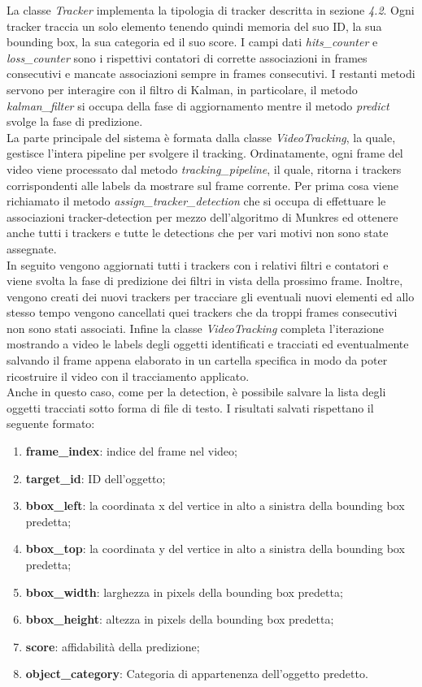 La classe \textit{Tracker} implementa la tipologia di tracker descritta in sezione \textit{4.2}. Ogni tracker traccia un solo elemento tenendo quindi memoria del suo ID, la sua bounding box, la sua categoria ed il suo score. I campi dati \textit{hits\_counter} e \textit{loss\_counter} sono i rispettivi contatori di corrette associazioni in frames consecutivi e mancate associazioni sempre in frames consecutivi. I restanti metodi servono per interagire con il filtro di Kalman, in particolare, il metodo \textit{kalman\_filter} si occupa della fase di aggiornamento mentre il metodo \textit{predict} svolge la fase di predizione.\\
La parte principale del sistema è formata dalla classe \textit{VideoTracking}, la quale, gestisce l'intera pipeline per svolgere il tracking. Ordinatamente, ogni frame del video viene processato dal metodo \textit{tracking\_pipeline}, il quale, ritorna i trackers corrispondenti alle labels da mostrare sul frame corrente. Per prima cosa viene richiamato il metodo \textit{assign\_tracker\_detection} che si occupa di effettuare le associazioni tracker-detection per mezzo dell'algoritmo di Munkres ed ottenere anche tutti i trackers e tutte le detections che per vari motivi non sono state assegnate.\\
In seguito vengono aggiornati tutti i trackers con i relativi filtri e contatori e viene svolta la fase di predizione dei filtri in vista della prossimo frame. Inoltre, vengono creati dei nuovi trackers per tracciare gli eventuali nuovi elementi ed allo stesso tempo vengono cancellati quei trackers che da troppi frames consecutivi non sono stati associati. Infine la classe \textit{VideoTracking} completa l'iterazione mostrando a video le labels degli oggetti identificati e tracciati ed eventualmente salvando il frame appena elaborato in un cartella specifica in modo da poter ricostruire il video con il tracciamento applicato.\\
Anche in questo caso, come per la detection, è possibile salvare la lista degli oggetti tracciati sotto forma di file di testo. I risultati salvati rispettano il seguente formato:
\begin{enumerate}
\item \textbf{frame\_index}: indice del frame nel video;
\item \textbf{target\_id}: ID dell'oggetto;
\item \textbf{bbox\_left}: la coordinata x del vertice in alto a sinistra della bounding box predetta;
\item \textbf{bbox\_top}: la coordinata y del vertice in alto a sinistra della bounding box predetta;
\item \textbf{bbox\_width}: larghezza in pixels della bounding box predetta;
\item \textbf{bbox\_height}: altezza in pixels della bounding box predetta;
\item \textbf{score}: affidabilità della predizione;
\item \textbf{object\_category}: Categoria di appartenenza dell'oggetto predetto.
\end{enumerate}
